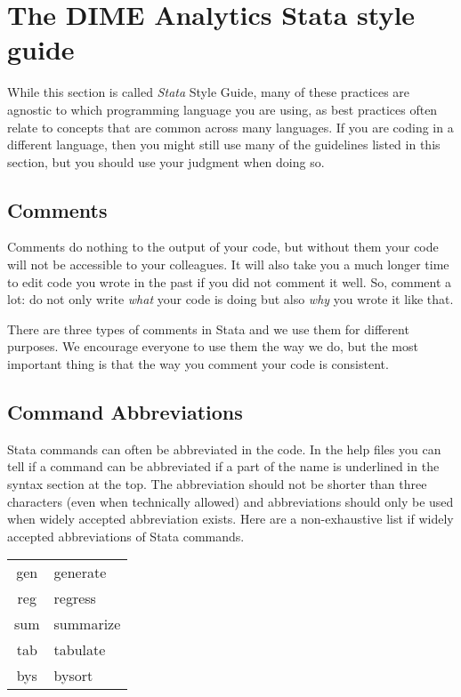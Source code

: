 \section{The DIME Analytics Stata style guide}

While this section is called \textit{Stata} Style Guide, many of these practices are agnostic to which
programming language you are using, as best practices often relate to concepts that are common across many
languages. If you are coding in a different language, then you might still use many of the guidelines
listed in this section, but you should use your judgment when doing so.

\subsection{Comments}

Comments do nothing to the output of your code, but without them your code will not be accessible to your colleagues.
It will also take you a much longer time to edit code you wrote in the past if you did not comment it well.
So, comment a lot: do not only write \textit{what} your code is doing but also \textit{why} you wrote it like that.

There are three types of comments in Stata and we use them for different purposes.
 We encourage everyone to use them the way we do,
 but the most important thing is that the way you comment your code is consistent.




\subsection{Command Abbreviations}

Stata commands can often be abbreviated in the code. In the help files you can tell if a command can be 
abbreviated if a part of the name is underlined in the syntax section at the top. The abbreviation should not 
be shorter than three characters (even when technically allowed) and abbreviations should only be used when 
widely accepted abbreviation exists. Here are a non-exhaustive list if widely accepted abbreviations of Stata commands.

\begin{center}
	\begin{tabular}{ c | l }
		\hline
		gen & generate \\
		reg & regress \\
		sum & summarize \\
		tab & tabulate \\
		bys & bysort \\
		\hline
	\end{tabular}
\end{center}

